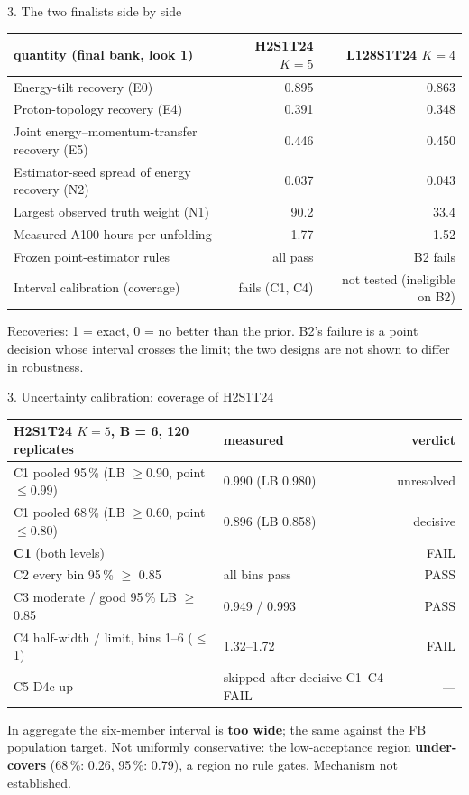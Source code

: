 \documentclass[aspectratio=169,10pt]{beamer}
\def\evidencetext{}
\begin{document}
\gdef\evidencetext{\texttt{results/final/decision\_look1.json}; \texttt{results/final/coverage\_dev/decision\_final.json}; \texttt{resources/cost\_fb\_look1-20260930.json}}
\begin{frame}{3. The two finalists side by side}
{\small
\begin{tabular}{lrr}
\toprule
quantity (final bank, look 1) & H2S1T24 $K{=}5$ & L128S1T24 $K{=}4$ \\
\midrule
Energy-tilt recovery (E0) & 0.895 & 0.863 \\
Proton-topology recovery (E4) & 0.391 & 0.348 \\
Joint energy--momentum-transfer recovery (E5) & 0.446 & 0.450 \\
Estimator-seed spread of energy recovery (N2) & 0.037 & 0.043 \\
Largest observed truth weight (N1) & 90.2 & 33.4 \\
Measured A100-hours per unfolding & 1.77 & 1.52 \\
Frozen point-estimator rules & all pass & B2 fails \\
Interval calibration (coverage) & fails (C1, C4) & not tested (ineligible on B2) \\
\bottomrule
\end{tabular}}\par\vspace{0.15cm}\scriptsize Recoveries: 1 = exact, 0 = no better than the prior. B2's failure is a point decision whose interval crosses the limit; the two designs are not shown to differ in robustness.
\end{frame}

\gdef\evidencetext{\texttt{results/final/coverage\_dev/coverage\_H2S1T24K5.json}}
\begin{frame}{3. Uncertainty calibration: coverage of H2S1T24}
{\scriptsize
\begin{tabular}{llr}
\toprule
H2S1T24 $K{=}5$, B = 6, 120 replicates & measured & verdict \\
\midrule
C1 pooled 95\,\% (LB $\ge$0.90, point $\le$0.99) & 0.990 (LB 0.980) & unresolved \\
C1 pooled 68\,\% (LB $\ge$0.60, point $\le$0.80) & 0.896 (LB 0.858) & decisive \\
\textbf{C1} (both levels) &  & FAIL \\
C2 every bin 95\,\% $\ge$ 0.85 & all bins pass & PASS \\
C3 moderate / good 95\,\% LB $\ge$ 0.85 & 0.949 / 0.993 & PASS \\
C4 half-width / limit, bins 1--6 ($\le$1) & 1.32--1.72 & FAIL \\
C5 D4c up & skipped after decisive C1--C4 FAIL & --- \\
\bottomrule
\end{tabular}}\par\vspace{0.15cm}\small In aggregate the six-member interval is \textbf{too wide}; the same against the FB population target. Not uniformly conservative: the low-acceptance region \textbf{under-covers} (68\,\%: 0.26, 95\,\%: 0.79), a region no rule gates. Mechanism not established.
\end{frame}
\end{document}
